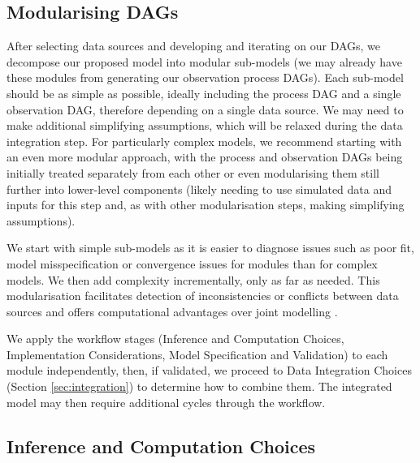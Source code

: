 \documentclass{article}
\begin{document}
\subsection{Modularising DAGs} \label{sec:modularise}

After selecting data sources and developing and iterating on our \ac{DAG}s, we decompose our proposed model into modular sub-models (we may already have these modules from generating our observation process \ac{DAG}s).
Each sub-model should be as simple as possible, ideally including the process DAG and a single observation DAG, therefore depending on a single data source.
We may need to make additional simplifying assumptions, which will be relaxed during the data integration step.
For particularly complex models, we recommend starting with an even more modular approach, with the process and observation DAGs being initially treated separately from each other or even modularising them still further into lower-level components (likely needing to use simulated data and inputs for this step and, as with other modularisation steps, making simplifying assumptions).

We start with simple sub-models as it is easier to diagnose issues such as poor fit, model misspecification or convergence issues for modules than for complex models.
We then add complexity incrementally, only as far as needed.
This modularisation facilitates detection of inconsistencies or conflicts between data sources \citep{presanis2013conflict,manderson2023combining} and offers computational advantages over joint modelling \citep{deangelis2018analysing,goudie2019joining,gelman2020bayesian,nicholson2022interoperability}.

We apply the workflow stages (Inference and Computation Choices, Implementation Considerations, Model Specification and Validation) to each module independently, then, if validated, we proceed to Data Integration Choices (Section \ref{sec:integration}) to determine how to combine them.
The integrated model may then require additional cycles through the workflow.

\subsection{Inference and Computation Choices}\label{sec:fitting}
\end{document}

